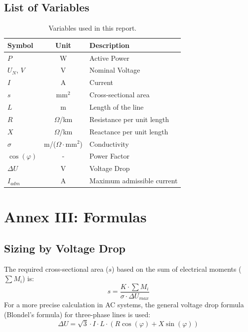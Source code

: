 \documentclass[12pt, a4paper]{article}
\begin{document}
\subsection{List of Variables}
\begin{table}[htbp]
    \centering
    \caption{Variables used in this report.}
    \label{tab:variables}
    \begin{tabular}{@{}lcl@{}}
        \toprule
        \textbf{Symbol} & \textbf{Unit} & \textbf{Description} \\ \midrule
        $P$ & W & Active Power \\
        $U_N$, $V$ & V & Nominal Voltage \\
        $I$ & A & Current \\
        $s$ & $\text{mm}^2$ & Cross-sectional area \\
        $L$ & m & Length of the line \\
        $R$ & $\Omega$/km & Resistance per unit length \\
        $X$ & $\Omega$/km & Reactance per unit length \\
        $\sigma$ & m/($\Omega \cdot \text{mm}^2$) & Conductivity \\
        $\cos(\varphi)$ & - & Power Factor \\
        $\Delta U$ & V & Voltage Drop \\
        $I_{adm}$ & A & Maximum admissible current \\
        \bottomrule
    \end{tabular}
\end{table}

\newpage

\newpage
\section{Annex III: Formulas}
\subsection{Sizing by Voltage Drop}
The required cross-sectional area ($s$) based on the sum of electrical moments ($\sum M_i$) is:
\begin{equation}
    s = \frac{K \cdot \sum M_i}{\sigma \cdot \Delta U_{max}}
\end{equation}
For a more precise calculation in AC systems, the general voltage drop formula (Blondel's formula) for three-phase lines is used:
\begin{equation}
    \Delta U = \sqrt{3} \cdot I \cdot L \cdot (R \cos(\varphi) + X \sin(\varphi))
\end{equation}
\end{document}
